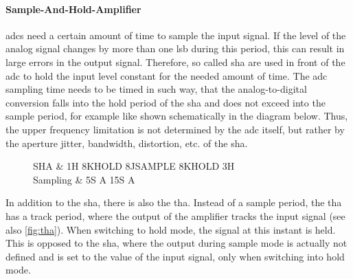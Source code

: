 \paragraph{Sample-And-Hold-Amplifier}
\Glspl{adc} need a certain amount of time to sample the input signal.
If the level of the analog signal changes by more than one \gls{lsb} during this period, this can result in large errors in the output signal.
Therefore, so called \gls{sha} are used in front of the \gls{adc} to hold the input level constant for the needed amount of time.
The \gls{adc} sampling time needs to be timed in such way, that the analog-to-digital conversion falls into the hold period of the \gls{sha} and does not exceed into the sample period, for example like shown schematically in the diagram below. Thus, the upper frequency limitation is not determined by the \gls{adc} itself, but rather by the aperture jitter, bandwidth, distortion, etc. of the \gls{sha}. \cite{walt}



\begin{figure} [H]
	\centering
	\tikzexternaldisable
	\begin{tikztimingtable}
		[%
		timing/dslope=0.1,
		timing/name/.style={font=\sffamily\normalsize},
		timing/d/text/.style={font=\sffamily\normalsize},
		grayz/.style={timing/z/.append style={gray}},
		timing/n/.style={rectangle},
		timing/metachar={{K}[2]{#1l !{++(0,+.5\yunit)} N[rectangle,scale=.6]{\shortstack{#2}} !{++(0,-.5\yunit)} #1l}},
		timing/metachar={{J}[2]{#1h !{++(0,-.5\yunit)} N[rectangle,scale=.6]{\shortstack{#2}} !{++(0,+.5\yunit)} #1h}},
		]
		SHA & 1H 8K{HOLD} 8J{SAMPLE} 8K{HOLD} 3H\\
		Sampling & 5S A 15S A                    \\
	\end{tikztimingtable}
	\tikzexternalenable
\end{figure}

In addition to the \gls{sha}, there is also the \gls{tha}.
Instead of a sample period, the \gls{tha} has a track period, where the output of the amplifier tracks the input signal (see also \autoref{fig:tha}).
When switching to hold mode, the signal at this instant is held. This is opposed to the \gls{sha}, where the output during sample mode is actually not defined and is set to the value of the input signal, only when switching into hold mode.

